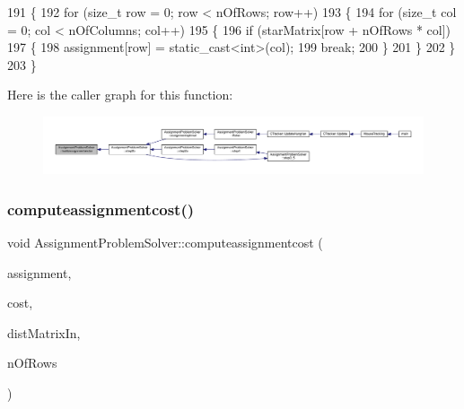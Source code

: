 \begin{DoxyCode}
191 \{
192     \textcolor{keywordflow}{for} (\textcolor{keywordtype}{size\_t} row = 0; row < nOfRows; row++)
193     \{
194         \textcolor{keywordflow}{for} (\textcolor{keywordtype}{size\_t} col = 0; col < nOfColumns; col++)
195         \{
196             \textcolor{keywordflow}{if} (starMatrix[row + nOfRows * col])
197             \{
198                 assignment[row] = \textcolor{keyword}{static\_cast<}\textcolor{keywordtype}{int}\textcolor{keyword}{>}(col);
199                 \textcolor{keywordflow}{break};
200             \}
201         \}
202     \}
203 \}
\end{DoxyCode}
Here is the caller graph for this function\+:\nopagebreak
\begin{figure}[H]
\begin{center}
\leavevmode
\includegraphics[width=350pt]{class_assignment_problem_solver_a1aa1c05dec6aef723f5d41affc667a77_icgraph}
\end{center}
\end{figure}
\mbox{\label{class_assignment_problem_solver_a978fa51f563d47dbd00c697704cf4ad9}} 
\subsubsection{\texorpdfstring{computeassignmentcost()}{computeassignmentcost()}}
{\footnotesize\ttfamily void Assignment\+Problem\+Solver\+::computeassignmentcost (\begin{DoxyParamCaption}\item[{const \mbox{\hyperlink{_hungarian_alg_8h_ad7b9f569a9adbd958c668a36b6884ffd}{assignments\+\_\+t}} \&}]{assignment,  }\item[{\mbox{\hyperlink{defines_8h_a7ce9c8817b42ab418e61756f579549ab}{track\+\_\+t}} \&}]{cost,  }\item[{const \mbox{\hyperlink{_hungarian_alg_8h_af6ab0ee8259a51215f62e8f96416d5bb}{dist\+Matrix\+\_\+t}} \&}]{dist\+Matrix\+In,  }\item[{size\+\_\+t}]{n\+Of\+Rows }\end{DoxyParamCaption})\hspace{0.3cm}{\ttfamily [private]}}



